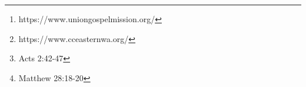 

\begin{abstract}
    \textit{
    By equipping the saints to lead and minister to people experiencing homelessness, especially queer people, in the context of Spokane, Washington, we as the Church will better live out the Gospel.
    The local church's ministry to queer people experiencing homelessness in Spokane is best accomplished by small teams with one leader, working in coordination with other long-term organizations (e.g. Union Gospel Mission\footnote{https://www.uniongospelmission.org/}, the House of Charity\footnote{https://www.cceasternwa.org/}, etc) already at work.
    The local church should not contribute to systemic problems or hinder the work of full-time ministries, but should contribute to the work of long-term organizations.
    The local church should apply its financial resources to tend to the poor in our city\footnote{Acts 2:42-47}, and its knowledge of the Gospel to bring more people into a saving knowledge of Christ\footnote{Matthew 28:18-20}.
    }
\end{abstract}
